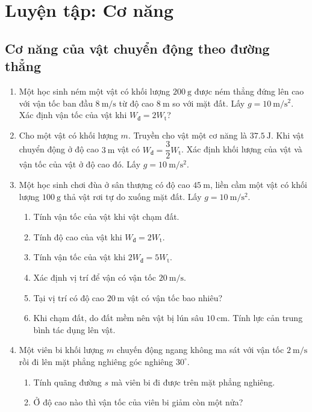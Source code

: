 \chapter{Luyện tập: Cơ năng}
\section{Cơ năng của vật chuyển động theo đường thẳng}
\begin{enumerate}
	\item %
	Một học sinh ném một vật có khối lượng $\SI{200}{\gram}$ được ném thẳng đứng lên cao với vận tốc ban đầu $\SI{8}{\meter/\second}$ từ độ cao $\SI{8}{\meter}$ so với mặt đất. Lấy $g= \SI{10}{\meter/\second^2}$. Xác định vận tốc của vật khi $W_\text{đ}=2W_\text{t}$?
	\item %
	Cho một vật có khối lượng $m$. Truyền cho vật một cơ năng là $\SI{37,5}{\joule}$. Khi vật chuyển động ở độ cao $\SI{3}{\meter}$ vật có $W_\text{đ}=\dfrac{3}{2}W_\text{t}$. Xác định khối lượng của vật và vận tốc của vật ở độ cao đó. Lấy $g= \SI{10}{\meter/\second^2}$.
	\item %
	Một học sinh chơi đùa ở sân thượng có độ cao $\SI{45}{\meter}$, liền cầm một vật có khối lượng $\SI{100}{\gram}$ thả vật rơi tự do xuống mặt đất. Lấy $g= \SI{10}{\meter/\second^2}$.
	\begin{enumerate}[label=\alph*)]
		\item Tính vận tốc của vật khi vật chạm đất.
		\item Tính độ cao của vật khi $W_\text{đ}=2W_\text{t}$.
		\item Tính vận tốc của vật khi $2W_\text{đ}=5W_\text{t}$.
		\item Xác định vị trí để vận có vận tốc $\SI{20}{\meter/\second}$.
		\item Tại vị trí có độ cao $\SI{20}{\meter}$ vật có vận tốc bao nhiêu?
		\item Khi chạm đất, do đất mềm nên vật bị lún sâu $\SI{10}{\centi\meter}$. Tính lực cản trung bình tác dụng lên vật.
	\end{enumerate}
	\item %
	Một viên bi khối lượng $m$ chuyến động ngang không ma sát với vận tốc $\SI{2}{\meter/\second}$ rồi đi lên mặt phẳng nghiêng góc nghiêng $30^\circ$.
	\begin{enumerate}[label=\alph*)]
		\item Tính quãng đường $s$ mà viên bi đi được trên mặt phẳng nghiêng.
		\item Ở độ cao nào thì vận tốc của viên bi giảm còn một nửa?

\end{enumerate}
\end{enumerate}
